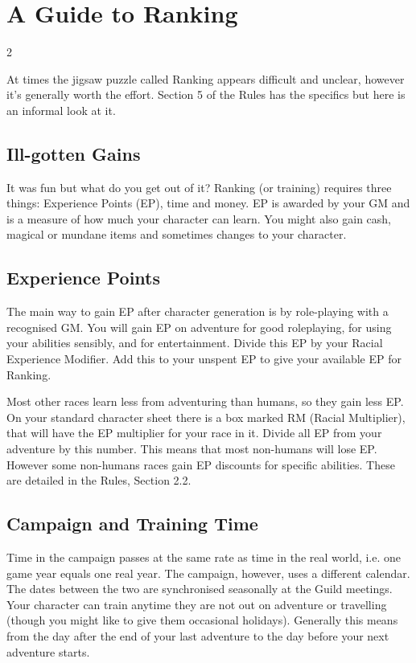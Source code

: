 \section{A Guide to Ranking}

\begin{multicols}{2}

At times the jigsaw puzzle called Ranking appears difficult and
unclear, however it’s generally worth the effort. Section 5 of the
Rules has the specifics but here is an informal look at it.

\subsection{Ill-gotten Gains}

It was fun but what do you get out of it?  Ranking (or training)
requires three things: Experience Points (EP), time and money.  EP is
awarded by your GM and is a measure of how much your character can
learn. You might also gain cash, magical or mundane items and
sometimes changes to your character.

\subsection{Experience Points}

The main way to gain EP after character generation is by role-playing
with a recognised GM. You will gain EP on adventure for good
roleplaying, for using your abilities sensibly, and for entertainment.
Divide this EP by your Racial Experience Modifier. Add this to your
unspent EP to give your available EP for Ranking.

Most other races learn less from adventuring than humans, so they gain
less EP. On your standard character sheet there is a box marked RM
(Racial Multiplier), that will have the EP multiplier for your race in
it.  Divide all EP from your adventure by this number. This means that
most non-humans will lose EP.  However some non-humans races gain EP
discounts for specific abilities. These are detailed in the Rules,
Section 2.2.

\subsection{Campaign and Training Time}

Time in the campaign passes at the same rate as time in the real
world, i.e. one game year equals one real year. The campaign, however,
uses a different calendar. The dates between the two are synchronised
seasonally at the Guild meetings. Your character can train anytime
they are not out on adventure or travelling (though you might like to
give them occasional holidays). Generally this means from the day
after the end of your last adventure to the day before your next
adventure starts.


\end{multicols}
